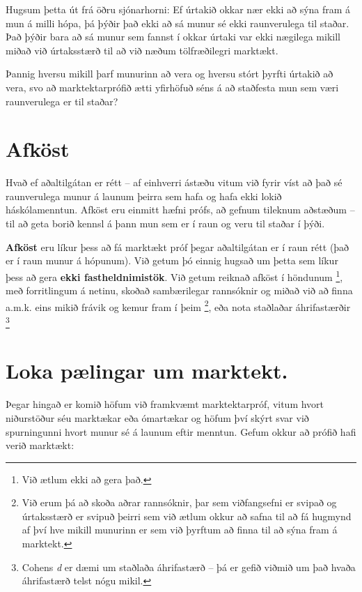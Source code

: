 \documentclass[
]{book}
\begin{document}
Hugsum þetta út frá öðru sjónarhorni: Ef úrtakið okkar nær ekki að sýna fram á mun á milli hópa, þá þýðir það ekki að sá munur sé ekki raunverulega til staðar. Það þýðir bara að sá munur sem fannst í okkar úrtaki var ekki nægilega mikill miðað við úrtaksstærð til að við næðum tölfræðilegri marktækt.

Þannig hversu mikill þarf munurinn að vera og hversu stórt þyrfti úrtakið að vera, svo að marktektarprófið ætti yfirhöfuð séns á að staðfesta mun sem væri raunverulega er til staðar?

\hypertarget{afkuxf6st}{%
\section{Afköst}\label{afkuxf6st}}

Hvað ef aðaltilgátan er rétt -- af einhverri ástæðu vitum við fyrir víst að það sé raunverulega munur á launum þeirra sem hafa og hafa ekki lokið háskólamenntun. Afköst eru einmitt hæfni prófs, að gefnum tileknum aðstæðum -- til að geta borið kennsl á þann mun sem er í raun og veru til staðar í þýði.

\textbf{Afköst} eru líkur þess að fá marktækt próf þegar aðaltilgátan er í raun rétt (það er í raun munur á hópunum). Við getum þó einnig hugsað um þetta sem líkur þess að gera \textbf{ekki fastheldnimistök}. Við getum reiknað afköst í höndunum \footnote{Við ætlum ekki að gera það.}, með forritlingum á netinu, skoðað sambærilegar rannsóknir og miðað við að finna a.m.k. eins mikið frávik og kemur fram í þeim \footnote{Við erum þá að skoða aðrar rannsóknir, þar sem viðfangsefni er svipað og úrtaksstærð er svipuð þeirri sem við ætlum okkur að safna til að fá hugmynd af því hve mikill munurinn er sem við þyrftum að finna til að sýna fram á marktekt.}, eða nota staðlaðar áhrifastærðir \footnote{Cohens \emph{d} er dæmi um staðlaða áhrifastærð -- þá er gefið viðmið um það hvaða áhrifastærð telst nógu mikil.}

\hypertarget{loka-puxe6lingar-um-marktekt.}{%
\section{Loka pælingar um marktekt.}\label{loka-puxe6lingar-um-marktekt.}}

Þegar hingað er komið höfum við framkvæmt marktektarpróf, vitum hvort niðurstöður séu marktækar eða ómartækar og höfum því skýrt svar við spurningunni hvort munur sé á launum eftir menntun. Gefum okkur að prófið hafi verið marktækt:
\end{document}
